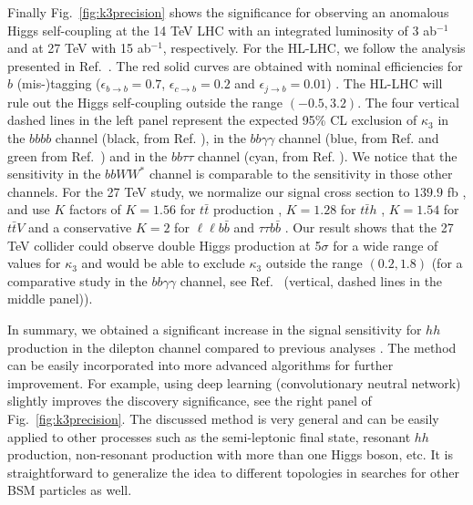 Finally Fig.~\ref{fig:k3precision} shows the significance for observing an anomalous Higgs self-coupling at the 14 TeV LHC with an integrated luminosity of 3 ab$^{-1}$ and at 27 TeV with 15 ab$^{-1}$, respectively. 
For the HL-LHC, we follow the analysis presented in Ref.~\cite{Kim:2018cxf}.
The red solid curves are obtained with nominal efficiencies for $b$ (mis-)tagging ($\epsilon_{b \to b} = 0.7$, $\epsilon_{c \to b} = 0.2$ and $\epsilon_{j \to b} = 0.01$) \cite{Sirunyan:2017ezt}. 
The HL-LHC will rule out the Higgs self-coupling outside the range $(-0.5, 3.2)$. The four vertical dashed lines in the left panel represent the expected 95\% CL exclusion of $\kappa_3$ in the $bbbb$ channel (black, from Ref. \cite{ATL-PHYS-PUB-2016-024}), in the $bb\gamma\gamma$ channel (blue, from Ref. \cite{Kling:2016lay} and green from Ref.~\cite{ATL-PHYS-PUB-2017-001}) and in the $bb\tau\tau$ channel (cyan, from Ref. \cite{Kim:2018uty}). We notice that the sensitivity in the $bbWW^*$ channel is comparable to the sensitivity in those other channels.  
For the 27 TeV study, we normalize our signal cross section to $139.9$ fb \cite{Grazzini:2018bsd}, and use $K$ factors of $K=1.56$ for $t\bar t$ production \cite{27TeV:ttbar}, $K=1.28$ for $t\bar  t h$ \cite{Demartin:2014fia}, $K=1.54$ for $t \bar t V$ and a conservative $K=2$ for $\ell\ell b \bar b$ and $\tau\tau b\bar b$ \cite{Kim:2018cxf}. 
Our result shows that the 27 TeV collider could observe double Higgs production at 5$\sigma$ for a wide range of values for $\kappa_3$ and would be able to exclude $\kappa_3$ outside the range $(0.2, 1.8)$ (for a comparative study in the $bb\gamma\gamma$ channel, see Ref.~\cite{Goncalves:2018qas} (vertical, dashed lines in the middle panel)).


In summary, we obtained a significant increase in the signal sensitivity for $hh$ production in the dilepton channel compared to previous analyses \cite{CMS:2015nat,CMS:2017cwx,Adhikary:2017jtu}. 
The method can be easily incorporated into more advanced algorithms for further improvement. 
For example, using deep learning (convolutionary neutral network) slightly improves the discovery significance, see the right panel of Fig.~\ref{fig:k3precision}.
The discussed method is very general and can be easily applied to other processes such as the semi-leptonic final state, resonant $hh$ production, non-resonant production with more than one Higgs boson, etc. It is straightforward to generalize the idea to different topologies in searches for other BSM particles as well.









